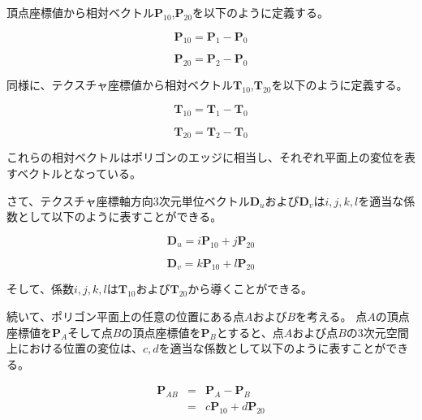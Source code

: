 \noindent
頂点座標値から相対ベクトル$\bm{P}_{10}$,$\bm{P}_{20}$を以下のように定義する。

\begin{equation}
\bm{P}_{10} = \bm{P}_1 - \bm{P}_0
\label{EP10}
\end{equation}

\begin{equation}
\bm{P}_{20} = \bm{P}_2 - \bm{P}_0
\label{EP20}
\end{equation}

\noindent
同様に、テクスチャ座標値から相対ベクトル$\bm{T}_{10}$,$\bm{T}_{20}$を以下のように定義する。

\begin{equation}
\bm{T}_{10} = \bm{T}_1 - \bm{T}_0
\label{ET10}
\end{equation}

\begin{equation}
\bm{T}_{20} = \bm{T}_2 - \bm{T}_0
\label{ET20}
\end{equation}

\noindent
これらの相対ベクトルはポリゴンのエッジに相当し、それぞれ平面上の変位を表すベクトルとなっている。

さて、テクスチャ座標軸方向3次元単位ベクトル$\bm{D}_u$および$\bm{D}_v$は$i,j,k,l$を適当な係数として以下のように表すことができる。

\begin{equation}
\bm{D}_u = i\bm{P}_{10} + j\bm{P}_{20}
\label{EUp}
\end{equation}

\begin{equation}
\bm{D}_v = k\bm{P}_{10} + l\bm{P}_{20}
\label{EVp}
\end{equation}

\noindent
そして、係数$i,j,k,l$は$\bm{T}_{10}$および$\bm{T}_{20}$から導くことができる。



続いて、ポリゴン平面上の任意の位置にある点$A$および$B$を考える。%
点$A$の頂点座標値を$\bm{P}_A$そして点$B$の頂点座標値を$\bm{P}_B$とすると、点$A$および点$B$の3次元空間上における位置の変位は、$c,d$を適当な係数として以下のように表すことができる。

\begin{eqnarray}
\bm{P}_{AB} &=& \bm{P}_A - \bm{P}_B\nonumber\\
           &=& c\bm{P}_{10} +  d\bm{P}_{20}  
\label{EPab}
\end{eqnarray}

